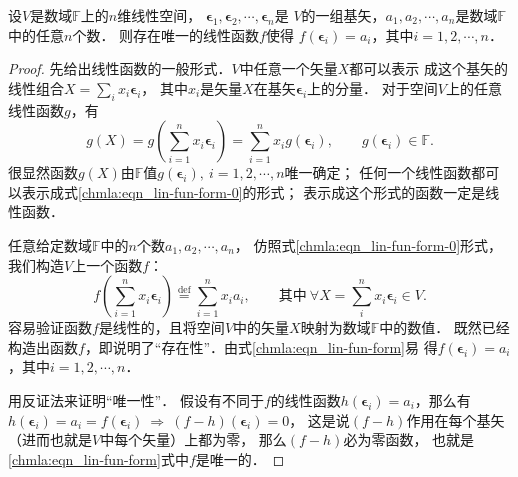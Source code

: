 \begin{theorem} \label{chmla:thm_lin-fun-basic}
    设$V$是数域$\mathbb{F}$上的$n$维线性空间，
    $\boldsymbol{\epsilon}_1,\boldsymbol{\epsilon}_2,\cdots,\boldsymbol{\epsilon}_n$是
    $V$的一组基矢，$a_1,a_2,\cdots,a_n$是数域$\mathbb{F}$中的任意$n$个数．
    则存在唯一的线性函数$f$使得
    $f\left(  \boldsymbol{\epsilon}_i\right) = a_i$，其中$i=1,2,\cdots,n$．
\end{theorem}
\begin{proof}
    先给出线性函数的一般形式．$V$中任意一个矢量$X$都可以表示
    成这个基矢的线性组合$X= \sum_{i}x_i \boldsymbol{\epsilon}_i $，
    其中$x_i$是矢量$X$在基矢$\boldsymbol{\epsilon}_i$上的分量．
    对于空间$V$上的任意线性函数$g$，有
    \begin{equation}\label{chmla:eqn_lin-fun-form-0}
        g(X)= g\left( \sum_{i=1}^{n} x_i \boldsymbol{\epsilon}_i\right)
        = \sum_{i=1}^{n} x_i g\left(  \boldsymbol{\epsilon}_i\right) ,
        \qquad g(\boldsymbol{\epsilon}_i ) \in \mathbb{F}.
    \end{equation}
    很显然函数$g(X)$由$\mathbb{F}$值$g(\boldsymbol{\epsilon}_i), \ i =1,2,\cdots,n$唯一确定；
    任何一个线性函数都可以表示成式\eqref{chmla:eqn_lin-fun-form-0}的形式；
    表示成这个形式的函数一定是线性函数．

    任意给定数域$\mathbb{F}$中的$n$个数$a_1,a_2,\cdots,a_n$，
    仿照式\eqref{chmla:eqn_lin-fun-form-0}形式，我们构造$V$上一个函数$f$：
    \begin{equation}\label{chmla:eqn_lin-fun-form}
        f\left( \sum_{i=1}^{n} x_i \boldsymbol{\epsilon}_i\right)
        \overset{\mathrm {def}}{=} \sum_{i=1}^{n}x_i a_i , \qquad
        {\text {其中}}\     \forall X = \sum_{i}^n x_i \boldsymbol{\epsilon}_i \in V.
    \end{equation}
    容易验证函数$f$是线性的，且将空间$V$中的矢量$X$映射为数域$\mathbb{F}$中的数值．
    既然已经构造出函数$f$，即说明了“存在性”．由式\eqref{chmla:eqn_lin-fun-form}易
    得$f\left(  \boldsymbol{\epsilon}_i\right) = a_i$，其中$i=1,2,\cdots,n$．

    用反证法来证明“唯一性”．
    假设有不同于$f$的线性函数$h(\boldsymbol{\epsilon}_i)=a_i$，那么有
    $h(\boldsymbol{\epsilon}_i)=a_i=f(\boldsymbol{\epsilon}_i)
    {\  \Rightarrow \   } (f-h)(\boldsymbol{\epsilon}_i)=0$，
    这是说$(f-h)$作用在每个基矢（进而也就是$V$中每个矢量）上都为零，
    那么$(f-h)$必为零函数，
    也就是\eqref{chmla:eqn_lin-fun-form}式中$f$是唯一的．
\end{proof}

